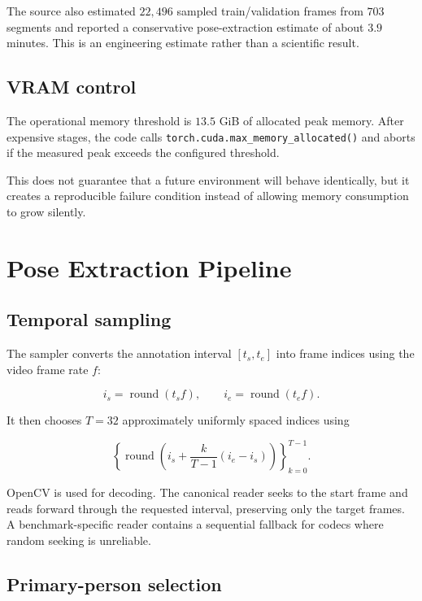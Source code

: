 \documentclass[11pt,a4paper]{article}
\newcommand{\code}[1]{\texttt{#1}}
\begin{document}
The source also estimated $22{,}496$ sampled train/validation frames from $703$ segments and reported a conservative pose-extraction estimate of about $3.9$ minutes. This is an engineering estimate rather than a scientific result.

\subsection{VRAM control}

The operational memory threshold is $13.5$ GiB of allocated peak memory. After expensive stages, the code calls \code{torch.cuda.max\_memory\_allocated()} and aborts if the measured peak exceeds the configured threshold.

This does not guarantee that a future environment will behave identically, but it creates a reproducible failure condition instead of allowing memory consumption to grow silently.

\section{Pose Extraction Pipeline}

\subsection{Temporal sampling}

The sampler converts the annotation interval $[t_s,t_e]$ into frame indices using the video frame rate $f$:

\begin{equation}
i_s = \operatorname{round}(t_s f),
\qquad
i_e = \operatorname{round}(t_e f).
\end{equation}

It then chooses $T=32$ approximately uniformly spaced indices using

\begin{equation}
\left\{
\operatorname{round}
\left(
i_s
+
\frac{k}{T-1}(i_e-i_s)
\right)
\right\}_{k=0}^{T-1}.
\end{equation}

OpenCV is used for decoding. The canonical reader seeks to the start frame and reads forward through the requested interval, preserving only the target frames. A benchmark-specific reader contains a sequential fallback for codecs where random seeking is unreliable.

\subsection{Primary-person selection}
\end{document}
